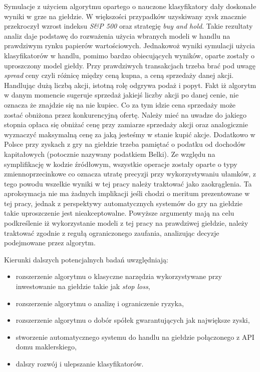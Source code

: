 \documentclass[a4paper, twoside, 11pt, openright]{article}
\begin{document}
\bigskip

Symulacje z użyciem algorytmu opartego o nauczone klasyfikatory dały doskonałe wyniki w grze na giełdzie. W większości przypadków uzyskiwany zysk znacznie przekroczył wzrost indeksu \textit{S\&P 500} oraz strategię \textit{buy and hold}. Takie rezultaty analiz daje podstawę do rozważenia użycia wbranych modeli w handlu na prawdziwym rynku papierów wartościowych. Jednakowoż wyniki symulacji użycia klasyfikatorów w handlu, pomimo bardzo obiecujących wyników, oparte zostały o uproszczony model giełdy. Przy prawdziwych transakcjach trzeba brać pod uwagę \textit{spread} ceny czyli różnicę między ceną kupna, a ceną sprzedaży danej akcji. Handlując dużą liczbą akcji, istotną rolę odgrywa podaż i popyt. Fakt iż algorytm w danym momencie sugeruje sprzedaż jakiejś liczby akcji po danej cenie, nie oznacza że znajdzie się na nie kupiec. Co za tym idzie cena sprzedaży może zostać obniżona przez konkurencyjną ofertę. Należy mieć na uwadze do jakiego stopnia opłaca się obniżać cenę przy zamiarze sprzedaży akcji oraz analogicznie wyznaczyć maksymalną cenę za jaką jesteśmy w stanie kupić akcje.  Dodatkowo w Polsce przy zyskach z gry na giełdzie trzeba pamiętać o podatku od dochodów kapitałowych (potocznie nazywany podatkiem Belki). Ze względu na symplifikację w kodzie źródłowym, wszystkie operacje zostały oparte o typy zmiennoprzecinkowe co oznacza utratę precyzji przy wykorzystywaniu ułamków, z tego powodu wszelkie wyniki w tej pracy należy traktować jako zaokrąglenia. Ta aproksymacja nie ma żadnych implikacji jeśli chodzi o meritum prezentowane w tej pracy, jednak z perspektywy automatycznych systemów do gry na giełdzie takie uproszczenie jest nieakceptowalne. Powyższe argumenty mają na celu podkreślenie iż wykorzystanie modeli z tej pracy na prawdziwej giełdzie, należy traktować zgodnie z regułą ograniczonego zaufania, analizując decyzje podejmowane przez algorytm.

\bigskip

Kierunki dalszych potencjalnych badań uwzględniają:
\begin{itemize}
	\item rozszerzenie algorytmu o klasyczne narzędzia wykorzystywane przy inwestowanie na giełdzie takie jak \textit{stop loss},
	\item rozszerzenie algorytmu o analizę i ograniczenie ryzyka,
	\item rozszerzenie algorytmu o dobór spółek gwarantujących jak największe zyski,
	\item stworzenie automatycznego systemu do handlu na giełdzie połączonego z API domu maklerskiego,
	\item dalszy rozwój i ulepszanie klasyfikatorów.
\end{itemize}
\end{document}
